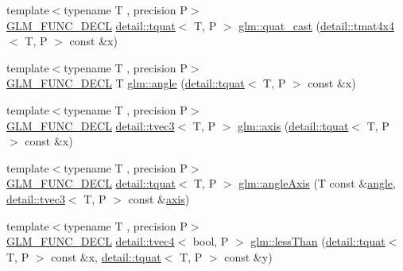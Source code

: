\begin{DoxyCompactItemize}
\item 
{\footnotesize template$<$typename T , precision P$>$ }\\\hyperlink{setup_8hpp_ab2d052de21a70539923e9bcbf6e83a51}{G\+L\+M\+\_\+\+F\+U\+N\+C\+\_\+\+D\+E\+CL} \hyperlink{structglm_1_1detail_1_1tquat}{detail\+::tquat}$<$ T, P $>$ \hyperlink{group__gtc__quaternion_ga385af22ef1a45c4464ddd28b80d5ce18}{glm\+::quat\+\_\+cast} (\hyperlink{structglm_1_1detail_1_1tmat4x4}{detail\+::tmat4x4}$<$ T, P $>$ const \&x)
\item 
{\footnotesize template$<$typename T , precision P$>$ }\\\hyperlink{setup_8hpp_ab2d052de21a70539923e9bcbf6e83a51}{G\+L\+M\+\_\+\+F\+U\+N\+C\+\_\+\+D\+E\+CL} T \hyperlink{group__gtc__quaternion_ga23a3fc7ada5bbb665ff84c92c6e0542c}{glm\+::angle} (\hyperlink{structglm_1_1detail_1_1tquat}{detail\+::tquat}$<$ T, P $>$ const \&x)
\item 
{\footnotesize template$<$typename T , precision P$>$ }\\\hyperlink{setup_8hpp_ab2d052de21a70539923e9bcbf6e83a51}{G\+L\+M\+\_\+\+F\+U\+N\+C\+\_\+\+D\+E\+CL} \hyperlink{structglm_1_1detail_1_1tvec3}{detail\+::tvec3}$<$ T, P $>$ \hyperlink{group__gtc__quaternion_ga8eef9f8c3f2e4836dccf09df975b20fb}{glm\+::axis} (\hyperlink{structglm_1_1detail_1_1tquat}{detail\+::tquat}$<$ T, P $>$ const \&x)
\item 
{\footnotesize template$<$typename T , precision P$>$ }\\\hyperlink{setup_8hpp_ab2d052de21a70539923e9bcbf6e83a51}{G\+L\+M\+\_\+\+F\+U\+N\+C\+\_\+\+D\+E\+CL} \hyperlink{structglm_1_1detail_1_1tquat}{detail\+::tquat}$<$ T, P $>$ \hyperlink{group__gtc__quaternion_ga771b3e16cca8324e7111b923476be666}{glm\+::angle\+Axis} (T const \&\hyperlink{group__gtc__quaternion_ga23a3fc7ada5bbb665ff84c92c6e0542c}{angle}, \hyperlink{structglm_1_1detail_1_1tvec3}{detail\+::tvec3}$<$ T, P $>$ const \&\hyperlink{group__gtc__quaternion_ga8eef9f8c3f2e4836dccf09df975b20fb}{axis})
\item 
{\footnotesize template$<$typename T , precision P$>$ }\\\hyperlink{setup_8hpp_ab2d052de21a70539923e9bcbf6e83a51}{G\+L\+M\+\_\+\+F\+U\+N\+C\+\_\+\+D\+E\+CL} \hyperlink{structglm_1_1detail_1_1tvec4}{detail\+::tvec4}$<$ bool, P $>$ \hyperlink{group__gtc__quaternion_ga4e4c37b86cecde7e1076c5b5fdb920b9}{glm\+::less\+Than} (\hyperlink{structglm_1_1detail_1_1tquat}{detail\+::tquat}$<$ T, P $>$ const \&x, \hyperlink{structglm_1_1detail_1_1tquat}{detail\+::tquat}$<$ T, P $>$ const \&y)

\end{DoxyCompactItemize}
